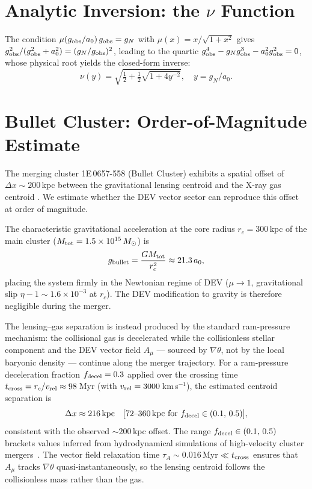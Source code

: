 \documentclass[aps,prd,twocolumn,showpacs,superscriptaddress]{revtex4-2}
\newcommand{\aO}{a_0}
\begin{document}
\section{Analytic Inversion: the $\nu$ Function}
\label{app:nu}

The condition $\mu(g_{\rm obs}/\aO)\,g_{\rm obs} = g_N$
with $\mu(x) = x/\sqrt{1+x^2}$ gives
$g_{\rm obs}^2/(g_{\rm obs}^2 + \aO^2) = (g_N/g_{\rm obs})^2$,
leading to the quartic $g_{\rm obs}^4 - g_N g_{\rm obs}^3 - \aO^2 g_{\rm obs}^2 = 0$,
whose physical root yields the closed-form inverse:
\begin{equation}
  \nu(y) = \sqrt{\tfrac{1}{2} + \tfrac{1}{2}\sqrt{1+4y^{-2}}},
  \quad y = g_N/\aO.
\end{equation}

\section{Bullet Cluster: Order-of-Magnitude Estimate}
\label{app:bullet}

The merging cluster 1E\,0657-558 (Bullet Cluster) exhibits
a spatial offset of $\Delta x \sim 200$\,kpc between the
gravitational lensing centroid and the X-ray gas centroid
\cite{Clowe2006}. We estimate whether the DEV vector sector
can reproduce this offset at order of magnitude.

The characteristic gravitational acceleration at the core
radius $r_c = 300$\,kpc of the main cluster
($M_{\rm tot} = 1.5\times10^{15}\,M_\odot$) is
\begin{equation}
  g_{\rm bullet} = \frac{GM_{\rm tot}}{r_c^2}
  \approx 21.3\,\aO,
\end{equation}
placing the system firmly in the Newtonian regime of DEV
($\mu \to 1$, gravitational slip $\eta - 1 \sim 1.6\times10^{-3}$
at $r_c$). The DEV modification to gravity is therefore
negligible during the merger.

The lensing--gas separation is instead produced by the
standard ram-pressure mechanism: the collisional gas is
decelerated while the collisionless stellar component and
the DEV vector field $A_\mu$ --- sourced by $\nabla\theta$,
not by the local baryonic density --- continue along the
merger trajectory. For a ram-pressure deceleration fraction
$f_{\rm decel} = 0.3$ applied over the crossing time
$t_{\rm cross} = r_c/v_{\rm rel} \approx 98$\,Myr
(with $v_{\rm rel} = 3000$\,km\,s$^{-1}$), the estimated
centroid separation is
\begin{equation}
  \Delta x \approx 216\,\mathrm{kpc}
  \quad [72\text{--}360\,\mathrm{kpc\ for\ }
  f_{\rm decel}\in(0.1,\,0.5)],
\end{equation}
consistent with the observed ${\sim}200$\,kpc offset.
The range $f_{\rm decel}\in(0.1,\,0.5)$ brackets values
inferred from hydrodynamical simulations of high-velocity
cluster mergers~\cite{SpringelFarrar2007}.
The vector field relaxation time $\tau_A \sim 0.016$\,Myr
$\ll t_{\rm cross}$ ensures that $A_\mu$ tracks
$\nabla\theta$ quasi-instantaneously, so the lensing
centroid follows the collisionless mass rather than the gas.
\end{document}
